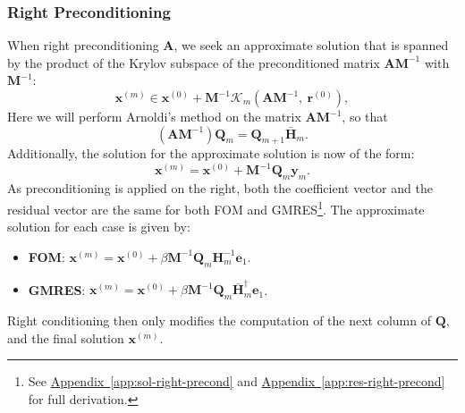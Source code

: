 \documentclass{article}
\begin{document}
\subsubsection{Right Preconditioning}
When right preconditioning \(\symbf{A}\), we seek an approximate
solution that is spanned by the product of the Krylov subspace of the
preconditioned matrix \(\symbf{A} \symbf{M}^{-1}\) with
\(\symbf{M}^{-1}\):
\begin{equation*}
    \symbf{x}^{\left( m \right)} \in \symbf{x}^{\left( 0 \right)} + \symbf{M}^{-1} \mathcal{K}_m\left( \symbf{A} \symbf{M}^{-1},\: \symbf{r}^{\left( 0 \right)} \right),
\end{equation*}
Here we will perform Arnoldi's method on the matrix \(\symbf{A} \symbf{M}^{-1}\),
so that
\begin{equation*}
    \left( \symbf{A} \symbf{M}^{-1} \right) \symbf{Q}_m = \symbf{Q}_{m+1} \bar{\symbf{H}}_m.
\end{equation*}
Additionally, the solution for the approximate solution is now of the
form:
\begin{equation*}
    \symbf{x}^{\left( m \right)} = \symbf{x}^{\left( 0 \right)} + \symbf{M}^{-1} \symbf{Q}_m \symbf{y}_m.
\end{equation*}
As preconditioning is applied on the right, both the coefficient vector
and the residual vector are the same for both FOM and GMRES\footnote{See \hyperref[app:sol-right-precond]{Appendix~\ref*{app:sol-right-precond}} and \hyperref[app:res-right-precond]{Appendix~\ref*{app:res-right-precond}} for full derivation.}.
The approximate solution for each case is given by:
\begin{itemize}
    \item \textbf{FOM}: \(\symbf{x}^{\left( m \right)} = \symbf{x}^{\left( 0 \right)} + \beta \symbf{M}^{-1} \symbf{Q}_m \symbf{H}_m^{-1} \symbf{e}_1\).
    \item \textbf{GMRES}: \(\symbf{x}^{\left( m \right)} = \symbf{x}^{\left( 0 \right)} + \beta \symbf{M}^{-1} \symbf{Q}_m \bar{\symbf{H}}_m^\dagger \symbf{e}_1\).
\end{itemize}
Right conditioning then only modifies the computation of the next column
of \(\symbf{Q}\), and the final solution \(\symbf{x}^{\left( m \right)}\).
\end{document}
